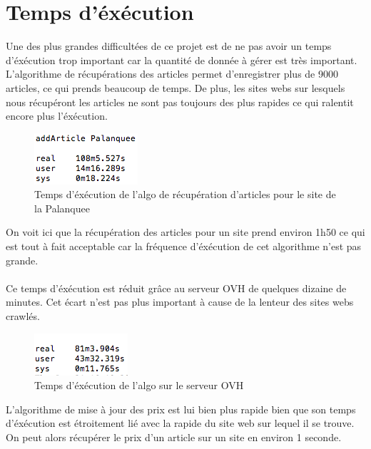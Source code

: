 \documentclass{report}
\begin{document}
\section{Temps d'éxécution}
Une des plus grandes difficultées de ce projet est de ne pas avoir un temps d'éxécution trop important car la quantité de donnée à gérer est très important.\\
L'algorithme de récupérations des articles permet d'enregistrer plus de 9000 articles, ce qui prends beaucoup de temps. De plus, les sites webs sur lesquels nous récupéront les articles ne sont pas toujours des plus rapides ce qui ralentit encore plus l'éxécution.\\
\begin{figure}[h]
\begin{center}
\includegraphics[scale = 0.7]{./img/palanquee1.png}
\caption{Temps d'éxécution de l'algo de récupération d'articles pour le site de la Palanquee}
\end{center}
\end{figure}
On voit ici que la récupération des articles pour un site prend environ 1h50 ce qui est tout à fait acceptable car la fréquence d'éxécution de cet algorithme n'est pas grande.\\\\
Ce temps d'éxécution est réduit grâce au serveur OVH de quelques dizaine de minutes. Cet écart n'est pas plus important à cause de la lenteur des sites webs crawlés.\\
\begin{figure}[h]
\begin{center}
\includegraphics[scale = 0.7]{./img/palanquee2.png}
\caption{Temps d'éxécution de l'algo sur le serveur OVH}
\end{center}
\end{figure}

L'algorithme de mise à jour des prix est lui bien plus rapide bien que son temps d'éxécution est étroitement lié avec la rapide du site web sur lequel il se trouve. On peut alors récupérer le prix d'un article sur un site en environ 1 seconde.\\\\
\end{document}
